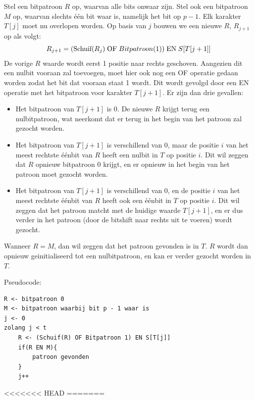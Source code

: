 \documentclass{report}
\begin{document}
\begin{enumerate}
	Stel een bitpatroon $R$ op, waarvan alle bits onwaar zijn. Stel ook een bitpatroon $M$ op, waarvan slechts één bit waar is, namelijk het bit op $p - 1$. Elk karakter $T[j]$ moet nu overlopen worden. Op basis van $j$ bouwen we een nieuwe $R$, $R_{j + 1}$ op  als volgt:
	$$R_{j + 1} = (\hbox{Schuif}(R_j)\;\hbox{OF}\;Bitpatroon(1))\;\hbox{EN}\;S[T[j + 1]]$$
	De vorige $R$ waarde wordt eerst 1 positie naar rechts geschoven. Aangezien dit een nulbit vooraan zal toevoegen, moet hier ook nog een OF operatie gedaan worden zodat het bit dat vooraan staat 1 wordt. Dit wordt gevolgd door een EN operatie met het bitpatroon voor karakter $T[j + 1]$. Er zijn dan drie gevallen:
	\begin{itemize}
		\item Het bitpatroon van $T[j + 1]$ is 0. De nieuwe $R$ krijgt terug een nulbitpatroon, wat neerkomt dat er terug in het begin van het patroon zal gezocht worden.
		\item Het bitpatroon van $T[j + 1]$ is verschillend van 0, maar de positie $i$ van het meest rechtste éénbit van $R$ heeft een nulbit in $T$ op positie $i$. Dit wil zeggen dat $R$ opnieuw bitpatroon 0 krijgt, en er opnieuw in het begin van het patroon moet gezocht worden.
		\item Het bitpatroon van $T[j + 1]$ is verschillend van 0, en de positie $i$ van het meest rechtste éénbit van $R$ heeft ook een éénbit in $T$ op positie $i$. Dit wil zeggen dat het patroon matcht met de huidige waarde $T[j + 1]$, en er dus verder in het patroon (door de bitshift naar rechts uit te voeren) wordt gezocht.
	\end{itemize}

	Wanneer $R = M$, dan wil zeggen dat het patroon gevonden is in $T$. $R$ wordt dan opnieuw geinitialiseerd tot een nulbitpatroon, en kan er verder gezocht worden in $T$.

	Pseudocode:
	\begin{lstlisting}
R <- bitpatroon 0
M <- bitpatroon waarbij bit p - 1 waar is
j <- 0
zolang j < t 
	R <- (Schuif(R) OF Bitpatroon 1) EN S[T[j]]
	if(R EN M){
		patroon gevonden
	} 
	j++
	\end{lstlisting}
\end{enumerate}

<<<<<<< HEAD
=======
\end{document}
